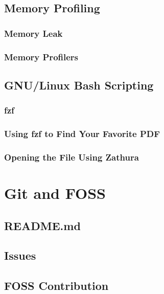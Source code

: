 \documentclass{article}
\begin{document}
\subsection{Memory Profiling}
\subsubsection{Memory Leak}
\subsubsection{Memory Profilers}
\subsection{GNU/Linux Bash Scripting}
\subsubsection{fzf}
\subsubsection{Using fzf to Find Your Favorite PDF}
\subsubsection{Opening the File Using Zathura}

\section{Git and FOSS}
\subsection{README.md}
\subsection{Issues}
\subsection{FOSS Contribution}
\end{document}
